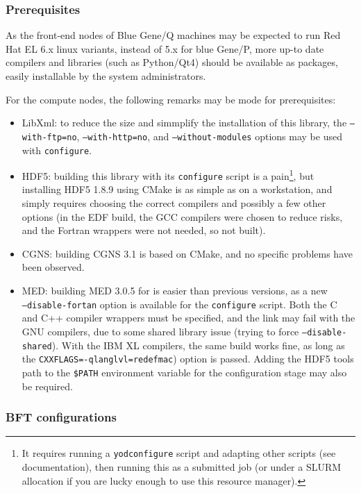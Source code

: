 \documentclass[a4paper,10pt,twoside]{article}
\begin{document}
\subsubsection{Prerequisites}

As the front-end nodes of Blue Gene/Q machines may be expected to run
Red Hat EL 6.x linux variants, instead of 5.x for blue Gene/P, more
up-to date compilers and libraries (such as Python/Qt4) should be available
as packages, easily installable by the system administrators.

For the compute nodes, the following remarks may be mode for prerequisites:

\begin{itemize}
\item LibXml: to reduce the size and simmplify the installation of this
library, the \texttt{--with-ftp=no}, \texttt{--with-http=no},
and \texttt{--without-modules} options may be used with \texttt{configure}.
\item HDF5: building this library with its \texttt{configure} script
is a pain\footnote{It requires running a \texttt{yodconfigure}
script and adapting other scripts (see documentation), then running
this as a submitted job (or under a SLURM allocation if you are lucky
enough to use this resource manager).}, but installing HDF5 1.8.9
using CMake is as simple as on a workstation, and simply requires
choosing the correct compilers and possibly a few other options (in
the EDF \CS build, the GCC compilers were chosen to reduce risks, and
the Fortran wrappers were not needed, so not built).
\item CGNS: building CGNS 3.1 is based on CMake, and no specific
problems have been observed.
\item MED: building MED 3.0.5 for \CS is easier than previous versions,
as a new \\ \texttt{--disable-fortan} option is available for the
\texttt{configure} script. Both the C and C++ compiler wrappers
must be specified, and the link may fail with the GNU compilers, due
to some shared library issue (trying to force \texttt{--disable-shared}).
With the IBM XL compilers, the same build works fine, as long as the
\texttt{CXXFLAGS=-qlanglvl=redefmac}) option is passed. Adding
the HDF5 tools path to the \texttt{\$PATH} environment variable for
the  configuration stage may also be required.
\end{itemize}

\subsubsection{BFT configurations}
\end{document}
